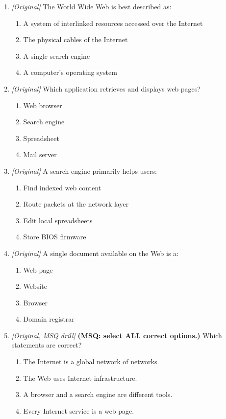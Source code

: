 \begin{enumerate}[label=\textbf{Q\arabic*.}, leftmargin=*]
\begin{enumerate}[label=\Alph*.]
  \end{enumerate}
\item \textit{[Original]} The World Wide Web is best described as:
  \begin{enumerate}[label=\Alph*.]
\item A system of interlinked resources accessed over the Internet
   \item The physical cables of the Internet
   \item A single search engine
   \item A computer's operating system
  \end{enumerate}

\item \textit{[Original]} Which application retrieves and displays web pages?
  \begin{enumerate}[label=\Alph*.]
\item Web browser
   \item Search engine
   \item Spreadsheet
   \item Mail server
  \end{enumerate}

\item \textit{[Original]} A search engine primarily helps users:
  \begin{enumerate}[label=\Alph*.]
\item Find indexed web content
   \item Route packets at the network layer
   \item Edit local spreadsheets
   \item Store BIOS firmware
  \end{enumerate}

\item \textit{[Original]} A single document available on the Web is a:
  \begin{enumerate}[label=\Alph*.]
\item Web page
   \item Website
   \item Browser
   \item Domain registrar
  \end{enumerate}

\item \textit{[Original, MSQ drill]} \textbf{(MSQ: select ALL correct options.)} Which statements are correct?
  \begin{enumerate}[label=\Alph*.]
\item The Internet is a global network of networks.
   \item The Web uses Internet infrastructure.
   \item A browser and a search engine are different tools.
   \item Every Internet service is a web page.
  \end{enumerate}

\end{enumerate}
